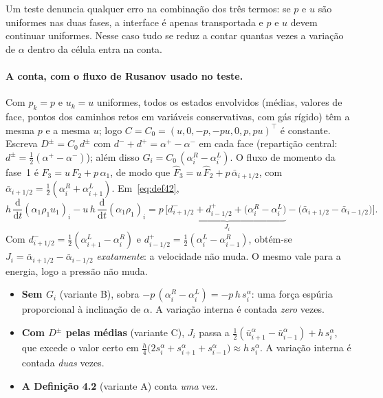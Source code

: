 \documentclass[11pt,a4paper]{article}
\theoremstyle{definition}
\theoremstyle{remark}
\newcommand{\dd}{\mathrm{d}}
\newcommand{\Fh}{\widehat F}
\newcommand{\ub}{\bar u}
\begin{document}
\begin{intuicao}
Um teste denuncia qualquer erro na combinação dos três termos: se $p$ e $u$ são uniformes nas duas fases, a interface é apenas transportada e $p$ e $u$ devem continuar uniformes. Nesse caso tudo se reduz a contar quantas vezes a variação de $\alpha$ dentro da célula entra na conta.
\end{intuicao}

\paragraph{A conta, com o fluxo de Rusanov usado no teste.} Com $p_k=p$ e $u_k=u$ uniformes, todos os estados envolvidos (médias, valores de face, pontos dos caminhos retos em variáveis conservativas, com gás rígido) têm a mesma $p$ e a mesma $u$; logo $C=C_0=(u,0,-p,-pu,0,p,pu)^\top$ é constante. Escreva $D^\pm=C_0\,d^\pm$ com $d^-+d^+=\alpha^+-\alpha^-$ em cada face (repartição central: $d^\pm=\frac12(\alpha^+-\alpha^-)$); além disso $G_i=C_0\,(\alpha_i^R-\alpha_i^L)$. O fluxo de momento da fase~1 é $F_3=u\,F_2+p\,\alpha_1$, de modo que $\Fh_3=u\,\Fh_2+p\,\bar\alpha_{i+1/2}$, com $\bar\alpha_{i+1/2}=\frac12(\alpha_i^R+\alpha_{i+1}^L)$. Em~\eqref{eq:def42},
\[
h\,\frac{\dd}{\dd t}(\alpha_1\rho_1u_1)_i-u\,h\,\frac{\dd}{\dd t}(\alpha_1\rho_1)_i
= p\,\Big[\underbrace{d^-_{i+1/2}+d^+_{i-1/2}+\big(\alpha_i^R-\alpha_i^L\big)}_{J_i}-\big(\bar\alpha_{i+1/2}-\bar\alpha_{i-1/2}\big)\Big].
\]
Com $d^-_{i+1/2}=\frac12(\alpha_{i+1}^L-\alpha_i^R)$ e $d^+_{i-1/2}=\frac12(\alpha_i^L-\alpha_{i-1}^R)$, obtém-se $J_i=\bar\alpha_{i+1/2}-\bar\alpha_{i-1/2}$ \emph{exatamente}: a velocidade não muda. O mesmo vale para a energia, logo a pressão não muda.

\begin{itemize}
\item \textbf{Sem $G_i$} (variante B), sobra $-p\,(\alpha_i^R-\alpha_i^L)=-p\,h\,s_i^\alpha$: uma força espúria proporcional à inclinação de $\alpha$. A variação interna é contada \emph{zero} vezes.
\item \textbf{Com $D^\pm$ pelas médias} (variante C), $J_i$ passa a $\frac12(\ub^\alpha_{i+1}-\ub^\alpha_{i-1})+h\,s_i^\alpha$, que excede o valor certo em $\frac h4\big(2s_i^\alpha+s_{i+1}^\alpha+s_{i-1}^\alpha\big)\approx h\,s_i^\alpha$. A variação interna é contada \emph{duas} vezes.
\item \textbf{A Definição 4.2} (variante A) conta \emph{uma} vez.
\end{itemize}
\end{document}
